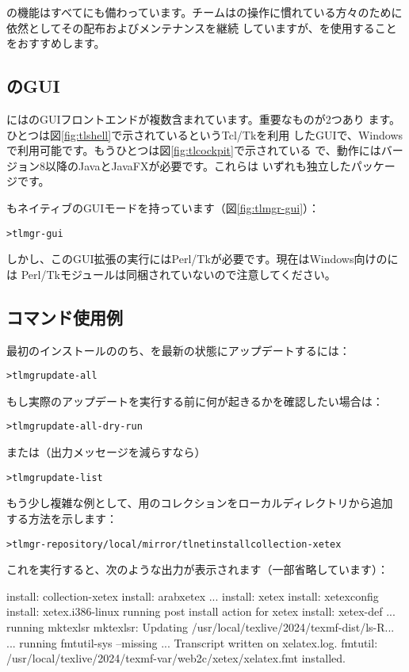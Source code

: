 \documentclass[uplatex,dvipdfmx,12pt]{jsarticle}
\begin{document}
の機能はすべてにも備わっています。\TL チームはの操作に慣れている方々のために依然としてその配布およびメンテナンスを継続
していますが、を使用することをおすすめします。

\subsection{のGUI}

\TL にはのGUIフロントエンドが複数含まれています。重要なものが2つあり
ます。ひとつは図\ref{fig:tlshell}で示されているというTcl/Tkを利用
したGUIで、Windowsで利用可能です。もうひとつは図\ref{fig:tlcockpit}で示されている
で、動作にはバージョン8以降のJavaとJavaFXが必要です。これらは
いずれも独立したパッケージです。

もネイティブのGUIモードを持っています（図\ref{fig:tlmgr-gui}）：
%
\begin{alltt}
> tlmgr -gui
\end{alltt}
%
しかし、このGUI拡張の実行にはPerl/Tkが必要です。現在はWindows向けの\TL には
Perl/Tkモジュールは同梱されていないので注意してください。

\subsection{コマンド使用例}

最初のインストールののち、\TL を最新の状態にアップデートするには：
%
\begin{alltt}
> tlmgr update -all
\end{alltt}
%
もし実際のアップデートを実行する前に何が起きるかを確認したい場合は：
%
\begin{alltt}
> tlmgr update -all -dry-run
\end{alltt}
%
または（出力メッセージを減らすなら）
%
\begin{alltt}
> tlmgr update -list
\end{alltt}

もう少し複雑な例として、\XeTeX 用のコレクションをローカルディレクトリから追加
する方法を示します：
%
\begin{alltt}
> tlmgr -repository /local/mirror/tlnet install collection-xetex
\end{alltt}
%
これを実行すると、次のような出力が表示されます（一部省略しています）：
%
\begin{fverbatim}
install: collection-xetex
install: arabxetex
...
install: xetex
install: xetexconfig
install: xetex.i386-linux
running post install action for xetex
install: xetex-def
...
running mktexlsr
mktexlsr: Updating /usr/local/texlive/2024/texmf-dist/ls-R...
...
running fmtutil-sys --missing
...
Transcript written on xelatex.log.
fmtutil: /usr/local/texlive/2024/texmf-var/web2c/xetex/xelatex.fmt installed.
\end{fverbatim}
\end{document}
